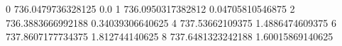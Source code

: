 0 736.0479736328125 0.0
1 736.0950317382812 0.04705810546875
2 736.3883666992188 0.34039306640625
4 737.53662109375 1.4886474609375
6 737.8607177734375 1.812744140625
8 737.6481323242188 1.60015869140625
